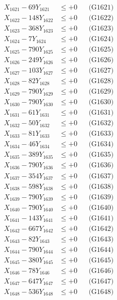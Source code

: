 \documentclass[a4paper,10pt]{article}
\begin{document}
{\begin{align}
\allowbreak
X_{1621} - 69Y_{1621} &\leq +0 && \text{(G1621)} \\
X_{1622} - 148Y_{1622} &\leq +0 && \text{(G1622)} \\
X_{1623} - 368Y_{1623} &\leq +0 && \text{(G1623)} \\
X_{1624} - 7Y_{1624} &\leq +0 && \text{(G1624)} \\
X_{1625} - 790Y_{1625} &\leq +0 && \text{(G1625)} \\
X_{1626} - 249Y_{1626} &\leq +0 && \text{(G1626)} \\
X_{1627} - 103Y_{1627} &\leq +0 && \text{(G1627)} \\
X_{1628} - 82Y_{1628} &\leq +0 && \text{(G1628)} \\
X_{1629} - 790Y_{1629} &\leq +0 && \text{(G1629)} \\
X_{1630} - 790Y_{1630} &\leq +0 && \text{(G1630)} \\
\allowbreak
X_{1631} - 61Y_{1631} &\leq +0 && \text{(G1631)} \\
X_{1632} - 50Y_{1632} &\leq +0 && \text{(G1632)} \\
X_{1633} - 81Y_{1633} &\leq +0 && \text{(G1633)} \\
X_{1634} - 46Y_{1634} &\leq +0 && \text{(G1634)} \\
X_{1635} - 389Y_{1635} &\leq +0 && \text{(G1635)} \\
X_{1636} - 790Y_{1636} &\leq +0 && \text{(G1636)} \\
X_{1637} - 354Y_{1637} &\leq +0 && \text{(G1637)} \\
X_{1638} - 598Y_{1638} &\leq +0 && \text{(G1638)} \\
X_{1639} - 790Y_{1639} &\leq +0 && \text{(G1639)} \\
X_{1640} - 790Y_{1640} &\leq +0 && \text{(G1640)} \\
\allowbreak
X_{1641} - 143Y_{1641} &\leq +0 && \text{(G1641)} \\
X_{1642} - 667Y_{1642} &\leq +0 && \text{(G1642)} \\
X_{1643} - 82Y_{1643} &\leq +0 && \text{(G1643)} \\
X_{1644} - 790Y_{1644} &\leq +0 && \text{(G1644)} \\
X_{1645} - 380Y_{1645} &\leq +0 && \text{(G1645)} \\
X_{1646} - 78Y_{1646} &\leq +0 && \text{(G1646)} \\
X_{1647} - 647Y_{1647} &\leq +0 && \text{(G1647)} \\
X_{1648} - 536Y_{1648} &\leq +0 && \text{(G1648)} \\

\end{align}}
\end{document}
